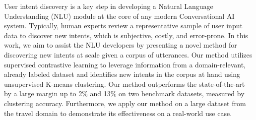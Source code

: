 User intent discovery is a key step in developing a Natural Language Understanding (NLU) module at the core of any modern Conversational AI system. Typically, human experts review a representative sample of user input data to discover new intents, which is subjective, costly, and error-prone. In this work, we aim to assist the NLU developers by presenting a novel method for discovering new intents at scale given a corpus of utterances. Our method utilizes supervised contrastive learning to leverage information from a domain-relevant, already labeled dataset and identifies new intents in the corpus at hand using unsupervised K-means clustering.  Our method outperforms the state-of-the-art by a large margin up to 2\% and 13\% on two benchmark datasets, measured by clustering accuracy. Furthermore, we apply our method on a large dataset from the travel domain to demonstrate its effectiveness on a real-world use case.

